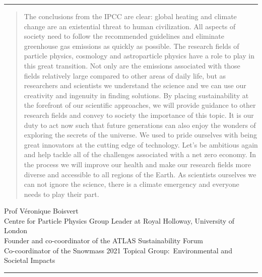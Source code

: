 \documentclass[../SustainableHEP.tex]{subfiles}
\begin{document}
\textcolor{Pythongreen}{\rule{2cm}{3pt}}

\begin{quotation}
The conclusions from the IPCC are clear: global heating and climate change are an existential threat to human civilization. All aspects of society need to follow the recommended guidelines and eliminate greenhouse gas emissions as quickly as possible. The research fields of particle physics, cosmology and astroparticle physics have a role to play in this great transition. Not only are the emissions associated with those fields relatively large compared to other areas of daily life, but as researchers and scientists we understand the science and we can use our creativity and ingenuity in finding solutions. By placing sustainability at the forefront of our scientific approaches, we will provide guidance to other research fields and convey to society the importance of this topic. It is our duty to act now such that future generations can also enjoy the wonders of exploring the secrets of the universe. We used to pride ourselves with being great innovators at the cutting edge of technology. Let’s be ambitious again and help tackle all of the challenges associated with a net zero economy. In the process we will improve our health and make our research fields more diverse and accessible to all regions of the Earth. As scientists ourselves we can not ignore the science, there is a climate emergency and everyone needs to play their part.
\end{quotation}
\begin{flushleft}
Prof V\'{e}ronique Boisvert\\
Centre for Particle Physics Group Leader at Royal Holloway, University of London\\
Founder and co-coordinator of the ATLAS Sustainability Forum\\
Co-coordinator of the Snowmass 2021 Topical Group:\ Environmental and Societal Impacts
\end{flushleft}

\textcolor{Pythongreen}{\rule{2cm}{3pt}}
\end{document}
